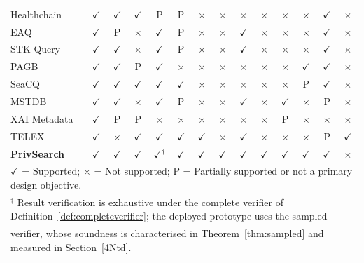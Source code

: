\documentclass[journal]{IEEEtran}
\theoremstyle{tight}
\theoremstyle{remark}
\theoremstyle{plain}
\begin{document}
\begin{table}[t]
{\begin{tabular}{lccccccccccccc}
Healthchain~\cite{Li}
& $\checkmark$ & $\checkmark$ & $\checkmark$ & P
& P & $\times$ & $\times$ & $\times$
& $\times$ & $\times$ & $\times$ & $\checkmark$ & $\times$ \\
 
EAQ~\cite{Yin}
& $\checkmark$ & P & $\times$ & $\checkmark$
& P & $\times$ & $\times$ & $\checkmark$
& $\times$ & $\times$ & $\times$ & $\checkmark$ & $\times$ \\
 
STK Query~\cite{Xu}
& $\checkmark$ & $\checkmark$ & $\times$ & $\checkmark$
& P & $\times$ & $\times$ & $\checkmark$
& $\times$ & $\times$ & $\times$ & $\checkmark$ & $\times$ \\
 
PAGB~\cite{Wu}
& $\checkmark$ & $\checkmark$ & P & $\checkmark$
& $\times$ & $\times$ & $\times$ & $\times$
& $\times$ & $\times$ & $\checkmark$ & $\checkmark$ & $\times$ \\
 
SeaCQ~\cite{Yang}
& $\checkmark$ & $\checkmark$ & $\checkmark$ & $\checkmark$
& $\checkmark$ & $\times$ & $\times$ & $\times$
& $\times$ & $\times$ & P & $\checkmark$ & $\times$ \\
 
MSTDB~\cite{Zhou}
& $\checkmark$ & $\checkmark$ & $\times$ & $\checkmark$
& P & $\times$ & $\times$ & $\checkmark$
& $\times$ & $\checkmark$ & $\times$ & P & $\times$ \\
 
XAI Metadata~\cite{Dutta}
& $\checkmark$ & P & P & $\times$
& $\times$ & $\times$ & $\times$ & $\times$
& $\times$ & P & $\times$ & $\times$ & $\times$ \\
 
TELEX~\cite{WuHaotian}
& $\checkmark$ & $\times$ & $\checkmark$ & $\checkmark$
& $\checkmark$ & $\checkmark$ & $\times$ & $\checkmark$
& $\times$ & $\times$ & $\times$ & P & $\checkmark$ \\
 
\textbf{PrivSearch}
& \textbf{$\checkmark$}
& \textbf{$\checkmark$}
& \textbf{$\checkmark$}
& \textbf{$\checkmark$}$^{\dagger}$
& \textbf{$\checkmark$}
& \textbf{$\checkmark$}
& \textbf{$\checkmark$}
& \textbf{$\checkmark$}
& \textbf{$\checkmark$}
& \textbf{$\checkmark$}
& \textbf{$\checkmark$}
& \textbf{$\checkmark$}
& \textbf{$\times$} \\
\hline
\multicolumn{14}{l}{\footnotesize
$\checkmark$ = Supported;\quad
$\times$ = Not supported;\quad
P = Partially supported or not a primary design objective.} \\
\multicolumn{14}{l}{\footnotesize
$^{\dagger}$ Result verification is exhaustive under the complete verifier of
Definition~\ref{def:completeverifier}; the deployed prototype uses the sampled} \\
\multicolumn{14}{l}{\footnotesize
\phantom{$^{\dagger}$ }verifier, whose soundness is characterised in Theorem~\ref{thm:sampled} and measured in Section~\ref{4Ntd}.}
\end{tabular}
}
\end{table}
 
\end{document}
